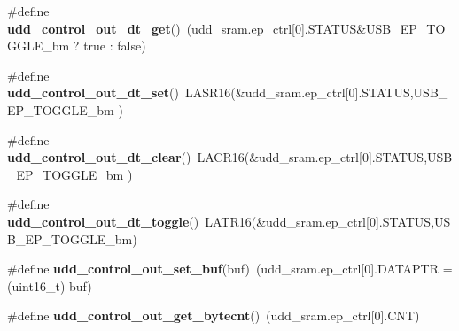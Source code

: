 \begin{DoxyCompactItemize}
\item 
\hypertarget{group__udd__xmega__usb__group_gaaebde283abafed21d59a46d463dc47d1}{\#define {\bfseries udd\-\_\-control\-\_\-out\-\_\-dt\-\_\-get}()~(udd\-\_\-sram.\-ep\-\_\-ctrl\mbox{[}0\mbox{]}.S\-T\-A\-T\-U\-S\&U\-S\-B\-\_\-\-E\-P\-\_\-\-T\-O\-G\-G\-L\-E\-\_\-bm ? true \-: false)}\label{group__udd__xmega__usb__group_gaaebde283abafed21d59a46d463dc47d1}

\item 
\hypertarget{group__udd__xmega__usb__group_gaa092d16d9c92b48cc928429471bdfaca}{\#define {\bfseries udd\-\_\-control\-\_\-out\-\_\-dt\-\_\-set}()~L\-A\-S\-R16(\&udd\-\_\-sram.\-ep\-\_\-ctrl\mbox{[}0\mbox{]}.S\-T\-A\-T\-U\-S,U\-S\-B\-\_\-\-E\-P\-\_\-\-T\-O\-G\-G\-L\-E\-\_\-bm )}\label{group__udd__xmega__usb__group_gaa092d16d9c92b48cc928429471bdfaca}

\item 
\hypertarget{group__udd__xmega__usb__group_gadf74aab79a4c399266a2c17c8050b9ad}{\#define {\bfseries udd\-\_\-control\-\_\-out\-\_\-dt\-\_\-clear}()~L\-A\-C\-R16(\&udd\-\_\-sram.\-ep\-\_\-ctrl\mbox{[}0\mbox{]}.S\-T\-A\-T\-U\-S,U\-S\-B\-\_\-\-E\-P\-\_\-\-T\-O\-G\-G\-L\-E\-\_\-bm )}\label{group__udd__xmega__usb__group_gadf74aab79a4c399266a2c17c8050b9ad}

\item 
\hypertarget{group__udd__xmega__usb__group_ga1c470322f4c920a39a18617148e0f6a1}{\#define {\bfseries udd\-\_\-control\-\_\-out\-\_\-dt\-\_\-toggle}()~L\-A\-T\-R16(\&udd\-\_\-sram.\-ep\-\_\-ctrl\mbox{[}0\mbox{]}.S\-T\-A\-T\-U\-S,U\-S\-B\-\_\-\-E\-P\-\_\-\-T\-O\-G\-G\-L\-E\-\_\-bm)}\label{group__udd__xmega__usb__group_ga1c470322f4c920a39a18617148e0f6a1}

\item 
\hypertarget{group__udd__xmega__usb__group_ga169a1bf5df92576c493758430e3da246}{\#define {\bfseries udd\-\_\-control\-\_\-out\-\_\-set\-\_\-buf}(buf)~(udd\-\_\-sram.\-ep\-\_\-ctrl\mbox{[}0\mbox{]}.D\-A\-T\-A\-P\-T\-R = (uint16\-\_\-t) buf)}\label{group__udd__xmega__usb__group_ga169a1bf5df92576c493758430e3da246}

\item 
\hypertarget{group__udd__xmega__usb__group_gadb60f2d916b019324277854383af78c8}{\#define {\bfseries udd\-\_\-control\-\_\-out\-\_\-get\-\_\-bytecnt}()~(udd\-\_\-sram.\-ep\-\_\-ctrl\mbox{[}0\mbox{]}.C\-N\-T)}\label{group__udd__xmega__usb__group_gadb60f2d916b019324277854383af78c8}

\end{DoxyCompactItemize}
